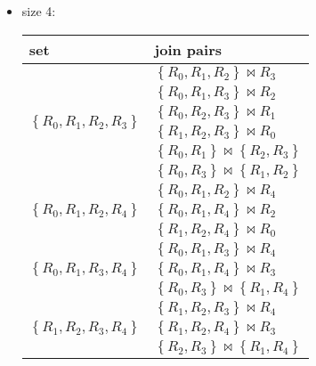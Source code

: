 \documentclass[12pt]{scrartcl}
\begin{document}
\begin{enumerate}
\begin{itemize}
		\item size 4: 
		\begin{table}[H]
			\begin{center}
				\begin{tabular}{ll}
					\hline
					set & join pairs \\ \hline 
					\multirow{6}{*}{$\left\lbrace R_{0}, R_{1}, R_{2}, R_{3}\right\rbrace$}	& $\left\lbrace R_{0}, R_{1}, R_{2}\right\rbrace \bowtie R_{3}$ \\
																							& $\left\lbrace R_{0}, R_{1}, R_{3}\right\rbrace \bowtie R_{2}$ \\
																							& $\left\lbrace R_{0}, R_{2}, R_{3}\right\rbrace \bowtie R_{1}$ \\
																							& $\left\lbrace R_{1}, R_{2}, R_{3}\right\rbrace \bowtie R_{0}$ \\ 
																							& $\left\lbrace R_{0}, R_{1}\right\rbrace \bowtie \left\lbrace R_{2}, R_{3}\right\rbrace $ \\
																							& $\left\lbrace R_{0}, R_{3}\right\rbrace \bowtie \left\lbrace R_{1}, R_{2}\right\rbrace $ \\ \hline
					
					\multirow{3}{*}{$\left\lbrace R_{0}, R_{1}, R_{2}, R_{4}\right\rbrace$}	& $\left\lbrace R_{0}, R_{1}, R_{2}\right\rbrace \bowtie R_{4}$ \\
																							& $\left\lbrace R_{0}, R_{1}, R_{4}\right\rbrace \bowtie R_{2}$ \\ 	
																							& $\left\lbrace R_{1}, R_{2}, R_{4}\right\rbrace \bowtie R_{0}$ \\ \hline
					\multirow{3}{*}{$\left\lbrace R_{0}, R_{1}, R_{3}, R_{4}\right\rbrace$}	& $\left\lbrace R_{0}, R_{1}, R_{3}\right\rbrace \bowtie R_{4}$ \\
																							& $\left\lbrace R_{0}, R_{1}, R_{4}\right\rbrace \bowtie R_{3}$ \\ 
																							& $\left\lbrace R_{0}, R_{3}\right\rbrace \bowtie \left\lbrace R_{1}, R_{4}\right\rbrace $ \\\hline
					\multirow{3}{*}{$\left\lbrace R_{1}, R_{2}, R_{3}, R_{4}\right\rbrace$}	& $\left\lbrace R_{1}, R_{2}, R_{3}\right\rbrace \bowtie R_{4}$ \\
																							& $\left\lbrace R_{1}, R_{2}, R_{4}\right\rbrace \bowtie R_{3}$ \\ 
																							& $\left\lbrace R_{2}, R_{3}\right\rbrace \bowtie \left\lbrace R_{1}, R_{4}\right\rbrace $ \\\hline		
				\end{tabular}
			\end{center}
		\end{table}
	

\end{itemize}
\end{enumerate}
\end{document}
